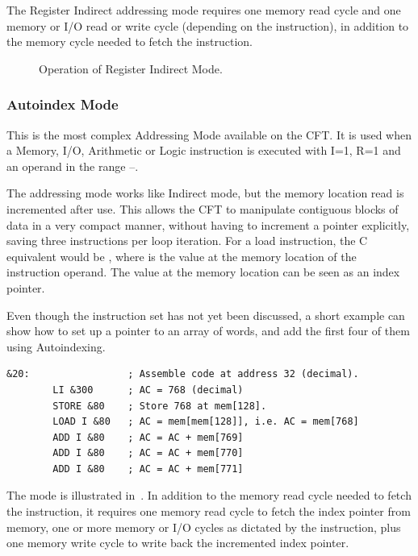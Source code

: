The Register Indirect addressing mode requires one memory read cycle and one
memory or I/O read or write cycle (depending on the instruction), in addition
to the memory cycle needed to fetch the instruction.

\begin{figure}[htb]
 \centering
 
\caption[Register Indirect Mode]{\label{fig:register-indirect-mode} Operation
  of Register Indirect Mode.}
\end{figure}


\subsubsection{Autoindex Mode}
\label{sec:autoindex-mode}

This is the most complex \gls{Addressing Mode} available on the
CFT. It is used when a Memory, I/O, Arithmetic or Logic instruction is
executed with I=1, R=1 and an operand in the range
–.

The addressing mode works like Indirect mode, but the memory location read is
incremented after use. This allows the CFT to manipulate contiguous blocks of
data in a very compact manner, without having to increment a pointer
explicitly, saving three instructions per loop iteration. For a load
instruction, the C equivalent would be , where
 is the value at the memory location of the instruction operand. The
value at the memory location can be seen as an index pointer.

Even though the instruction set has not yet been discussed, a short example can
show how to set up a pointer to an array of words, and add the first four of
them using Autoindexing.

\begin{lstlisting}[language=cftasm]
&20:                 ; Assemble code at address 32 (decimal).
        LI &300      ; AC = 768 (decimal)
        STORE &80    ; Store 768 at mem[128].
        LOAD I &80   ; AC = mem[mem[128]], i.e. AC = mem[768]
        ADD I &80    ; AC = AC + mem[769]
        ADD I &80    ; AC = AC + mem[770]
        ADD I &80    ; AC = AC + mem[771]
\end{lstlisting}

The mode is illustrated in~. In addition to the memory
read cycle needed to fetch the instruction, it requires one memory read cycle
to fetch the index pointer from memory, one or more memory or I/O cycles as
dictated by the instruction, plus one memory write cycle to write back the
incremented index pointer.

